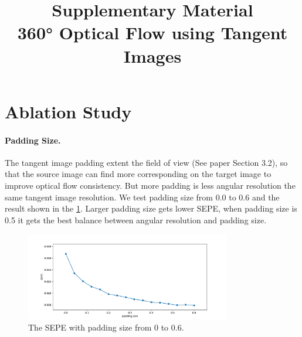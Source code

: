 \documentclass{bmvc2k}
\title{Supplementary Material \\
360\!° Optical Flow using Tangent Images}
\newcommand{\TODO}[1]{\textcolor{red}{{[TODO: #1]}}}
\begin{document}
\maketitle

%
%


%
%


\section{Ablation Study}
\label{sec:sup:ablations}


\paragraph{Padding Size.}

The tangent image padding extent the field of view  (See paper Section 3.2), so that the source image can find more corresponding on the target image to improve optical flow consistency.
But more padding is less angular resolution the same tangent image resolution.
%
We test padding size from 0.0 to 0.6 and the result shown in the \cref{fig:sup:ablationpadding}.
Larger padding size gets lower SEPE, when padding size is 0.5 it gets the best balance between angular resolution and padding size.


\begin{figure}[hbt!]
	\centering
	\includegraphics[width=0.80\textwidth]{images/abla_padding.pdf}
	\caption{\label{fig:sup:ablationpadding}%
		The SEPE with padding size from 0 to 0.6.}
\end{figure}
\end{document}
